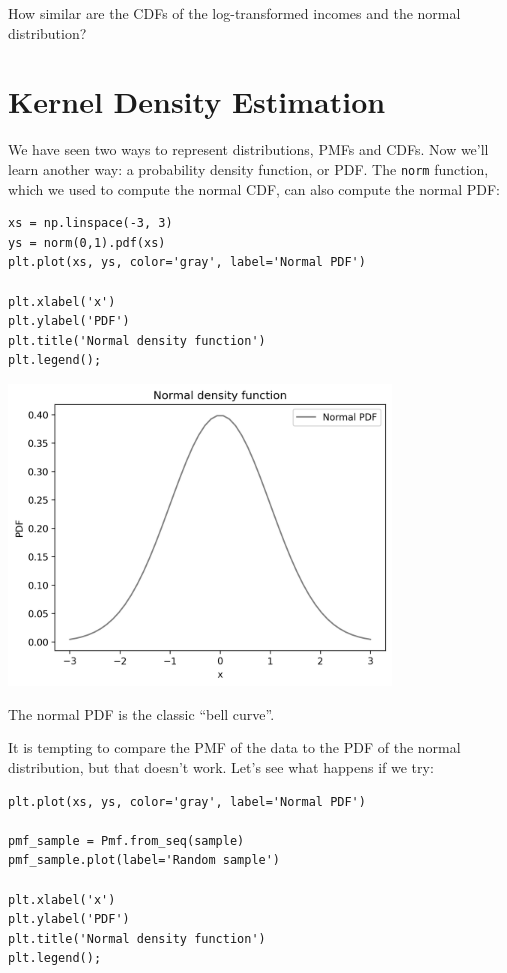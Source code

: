How similar are the CDFs of the log-transformed incomes and the normal
distribution?

\hypertarget{kernel-density-estimation}{%
\section{Kernel Density Estimation}\label{kernel-density-estimation}}

We have seen two ways to represent distributions, PMFs and CDFs. Now
we'll learn another way: a probability density function, or PDF. The
\passthrough{\lstinline!norm!} function, which we used to compute the
normal CDF, can also compute the normal PDF:

\begin{lstlisting}[]
xs = np.linspace(-3, 3)
ys = norm(0,1).pdf(xs)
plt.plot(xs, ys, color='gray', label='Normal PDF')

plt.xlabel('x')
plt.ylabel('PDF')
plt.title('Normal density function')
plt.legend();
\end{lstlisting}

\begin{center}
\includegraphics[width=4in]{chapters/08_distributions_files/08_distributions_118_0.png}
\end{center}

The normal PDF is the classic ``bell curve''.

It is tempting to compare the PMF of the data to the PDF of the normal
distribution, but that doesn't work. Let's see what happens if we try:

\begin{lstlisting}[]
plt.plot(xs, ys, color='gray', label='Normal PDF')

pmf_sample = Pmf.from_seq(sample)
pmf_sample.plot(label='Random sample')

plt.xlabel('x')
plt.ylabel('PDF')
plt.title('Normal density function')
plt.legend();
\end{lstlisting}

